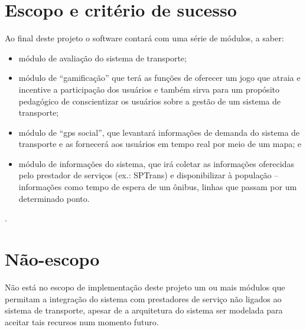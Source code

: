 \section{Escopo e critério de sucesso}\label{sec:Escopo}
	Ao final deste projeto o software contará com uma série de módulos, a saber:
	\begin{itemize}%
		\item módulo de avaliação do sistema de transporte;
		\item módulo de “gamificação” que terá as funções de oferecer um jogo que atraia e incentive a participação dos usuários e também sirva para um propósito pedagógico de conscientizar os usuários sobre a gestão de um sistema de transporte;
		\item módulo de “gps social”, que levantará informações de demanda do sistema de transporte e as fornecerá aos usuários em tempo real por meio de um mapa; e
		\item módulo de informações do sistema, que irá coletar as informações oferecidas pelo prestador de serviços (ex.: SPTrans) e disponibilizar à população – informações como tempo de espera de um ônibus, linhas que passam por um determinado ponto.
	\end{itemize}.

\section{Não-escopo}\label{sec:NãoEscopo}
	Não está no escopo de implementação deste projeto um ou mais módulos que permitam a integração do sistema com prestadores de serviço não ligados ao sistema de transporte, apesar de a arquitetura do sistema ser modelada para aceitar tais recursos num momento futuro.

